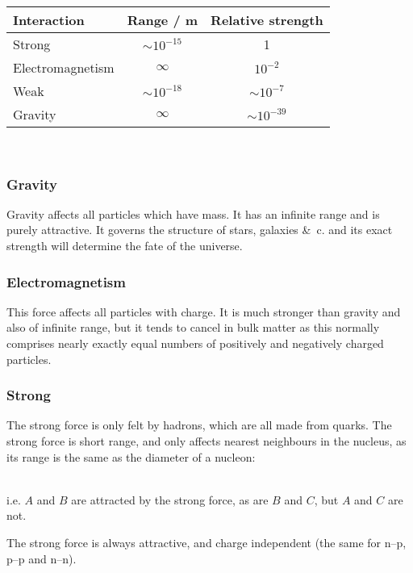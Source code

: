 \documentclass[a4paper,12pt]{article}
\begin{document}
\begin{tabular}{lcc}
\hline
Interaction & Range / m & Relative strength\\
\hline
Strong & $\sim 10^{-15}$ & 1\\
Electromagnetism & $\infty$ & $10^{-2}$\\
Weak & $\sim 10^{-18}$ & $\sim 10^{-7}$\\
Gravity & $\infty$ & $\sim 10^{-39}$\\
\hline
\end{tabular}\\

\subsubsection{Gravity}
Gravity affects all particles which have mass.  It has an infinite range and is purely attractive.  It governs the structure of stars, galaxies \&\ c. and its exact strength will determine the fate of the universe.

\subsubsection{Electromagnetism}
This force affects all particles with charge.  It is much stronger than gravity and also of infinite range, but it tends to cancel in bulk matter as this normally comprises nearly exactly equal numbers of positively and negatively charged particles.

\subsubsection{Strong}

The strong force is only felt by hadrons, which are all made from quarks.  The strong force is short range, and only affects nearest neighbours in the nucleus, as its range is the same as the diameter of a nucleon:\\

\\
i.e. $A$ and $B$ are attracted by the strong force, as are $B$ and $C$, but $A$ and $C$ are not.

The strong force is always attractive, and charge independent (the same for n--p, p--p and n--n).
\end{document}
